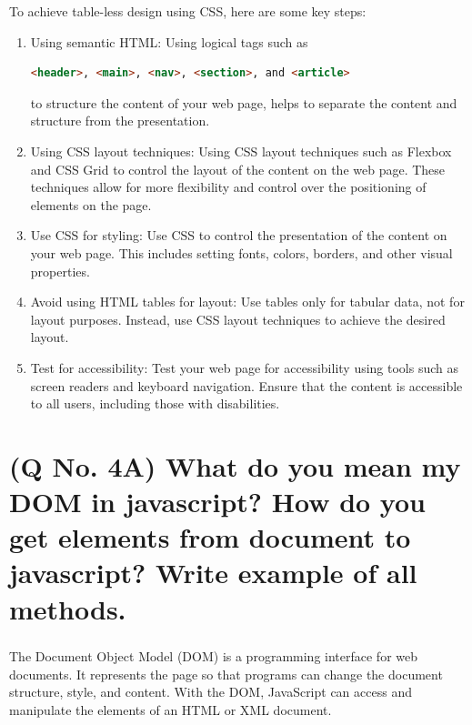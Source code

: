 \documentclass[11pt]{article}
\begin{document}
    To achieve table-less design using CSS, here are some key steps:
    
        \begin{enumerate}
            \item Using semantic HTML: Using logical tags such as 
            \begin{lstlisting}[language=html]
                <header>, <main>, <nav>, <section>, and <article>
            \end{lstlisting} 
            to structure the content of your web page, helps to separate the content and structure from the presentation.
    
            \item Using CSS layout techniques: Using CSS layout techniques such as Flexbox and CSS Grid to control the layout of the content on the web page. These techniques allow for more flexibility and control over the positioning of elements on the page.
    
            \item Use CSS for styling: Use CSS to control the presentation of the content on your web page. This includes setting fonts, colors, borders, and other visual properties.
    
            \item Avoid using HTML tables for layout: Use tables only for tabular data, not for layout purposes. Instead, use CSS layout techniques to achieve the desired layout.
    
            \item Test for accessibility: Test your web page for accessibility using tools such as screen readers and keyboard navigation. Ensure that the content is accessible to all users, including those with disabilities.
        \end{enumerate}
        




\section{(Q No. 4A) What do you mean my DOM in javascript? How do you get elements from document to javascript? Write example of all methods.}
\subparagraph{}
The Document Object Model (DOM) is a programming interface for web documents. It represents the page so that programs can change the document structure, style, and content. With the DOM, JavaScript can access and manipulate the elements of an HTML or XML document.
\end{document}
